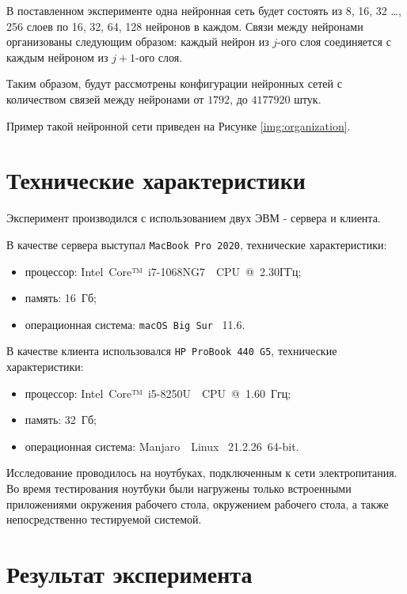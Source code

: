 В поставленном эксперименте одна нейронная сеть будет состоять из 8, 16, 32 \dots, 256 слоев по 16, 32, 64, 128 нейронов в каждом. Связи между нейронами организованы следующим образом: каждый нейрон из $j$-ого слоя соединяется с каждым нейроном из $j+1$-ого слоя. 

Таким образом, будут рассмотрены конфигурации нейронных сетей с количеством связей между нейронами от $1792$, до $4177920$ штук.

Пример такой нейронной сети приведен на Рисунке \ref{img:organization}.


\section{Технические характеристики}

Эксперимент производился с использованием двух ЭВМ - сервера  и клиента.

В качестве сервера выступал \texttt{MacBook~Pro~2020}, технические характеристики:
\begin{itemize}
	\item процессор: Intel~Core™~i7-1068NG7~\cite{i7}~CPU~@~2.30ГГц;
	\item память: 16~Гб;
	\item операционная система: \texttt{macOS~Big~Sur}~\cite{bigsur} 11.6.
\end{itemize}


В качестве клиента использовался \texttt{HP ProBook 440 G5}, технические характеристики:
\begin{itemize}
	\item процессор: Intel~Core™~i5-8250U~\cite{i5}~CPU~@~1.60~Ггц;
	\item память: 32~Гб;
	\item операционная система: Manjaro~\cite{manjaro}~Linux~\cite{linux} 21.2.26~64-bit.
\end{itemize}

Исследование проводилось на ноутбуках, подключенным к сети электропитания. Во время тестирования ноутбуки были нагружены только встроенными приложениями окружения рабочего стола, окружением рабочего стола, а также непосредственно тестируемой системой.

\section{Результат эксперимента}

